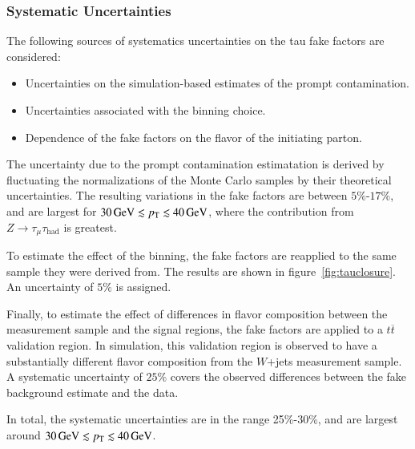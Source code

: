 \subsubsection{Systematic Uncertainties}\label{sec:ff-tau-systematics}
The following sources of systematics uncertainties on the tau fake factors are considered:

\begin{itemize}
\item Uncertainties on the simulation-based estimates of the prompt contamination.
\item Uncertainties associated with the binning choice.
\item Dependence of the fake factors on the flavor of the initiating parton.
\end{itemize}

The uncertainty due to the prompt contamination estimatation is derived by fluctuating the normalizations of the Monte Carlo samples by their theoretical uncertainties. The resulting variations in the fake factors are between $5\%$-$17\%$, and  are largest for $\SI{30}{\giga\electronvolt}\lesssim p_{\text{T}} \lesssim \SI{40}{\giga\electronvolt}$, where the contribution from $Z\rightarrow \tau_{\mu}\tau_{\mathrm{had}}$ is greatest. 

To estimate the effect of the binning, the fake factors are reapplied to the same sample they were derived from. The results are shown in figure~\ref{fig:tauclosure}. An uncertainty of $5\%$ is assigned.

Finally, to estimate the effect of differences in flavor composition between the measurement sample and the signal regions, the fake factors are applied to a $t\overline{t}$ validation region. In simulation, this validation region is observed to have a substantially different flavor composition from the $W$+jets measurement sample. A systematic uncertainty of $25\%$ covers the observed differences between the fake background estimate and the data. 

In total, the systematic uncertainties are in the range 25\%-30\%, and are largest around $\SI{30}{\giga\electronvolt}\lesssim p_{\text{T}} \lesssim \SI{40}{\giga\electronvolt}$. 

